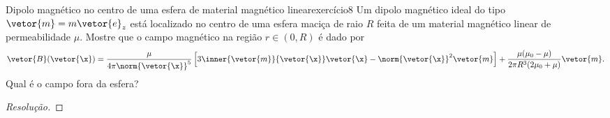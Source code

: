 \begin{exercício}{Dipolo magnético no centro de uma esfera de material magnético linear}{exercício8}
    Um dipolo magnético ideal do tipo \(\vetor{m} = m\vetor{e}_z\) está localizado no centro de uma esfera maciça de raio \(R\) feita de um material magnético linear de permeabilidade \(\mu\). Mostre que o campo magnético na região \(r \in (0,R)\) é dado por
    \begin{equation*}
        \vetor{B}(\vetor{\x}) = \frac{\mu}{4\pi\norm{\vetor{\x}}^5}\left[3\inner{\vetor{m}}{\vetor{\x}}\vetor{\x} - \norm{\vetor{\x}}^2\vetor{m}\right] + \frac{\mu(\mu_0 - \mu)}{2\pi R^3(2\mu_0 + \mu)}\vetor{m}.
    \end{equation*}
    Qual é o campo fora da esfera?
\end{exercício}
\begin{proof}[Resolução]

\end{proof}
